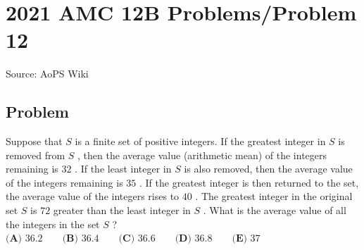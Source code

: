 \documentclass[12pt]{article}
\begin{document}
\section*{{2021 AMC 12B Problems/Problem 12}}
Source: AoPS Wiki

\subsection*{Problem}
Suppose that $S$ is a finite set of positive integers. If the greatest integer in $S$ is removed from $S$ , then the average value (arithmetic mean) of the integers remaining is $32$ . If the least integer in $S$ is also removed, then the average value of the integers remaining is $35$ . If the greatest integer is then returned to the set, the average value of the integers rises to $40$ . The greatest integer in the original set $S$ is $72$ greater than the least integer in $S$ . What is the average value of all the integers in the set $S$ ? $\textbf{(A) }36.2 \qquad \textbf{(B) }36.4 \qquad \textbf{(C) }36.6\qquad \textbf{(D) }36.8 \qquad \textbf{(E) }37$
\end{document}
